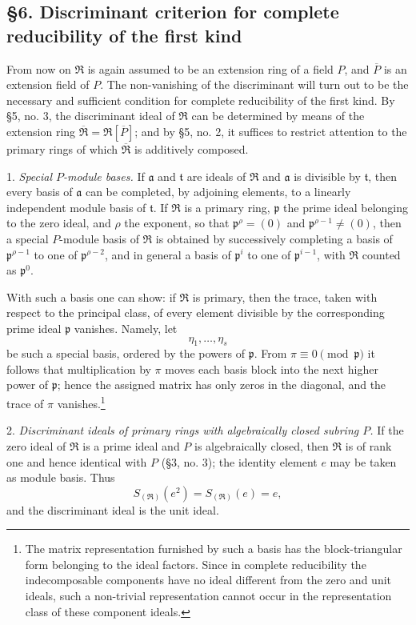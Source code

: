\documentclass[11pt]{article}
\providecommand{\mR}{\mathfrak{R}}
\providecommand{\bR}{\overline{\mathfrak{R}}}
\providecommand{\ma}{\mathfrak{a}}
\providecommand{\mpideal}{\mathfrak{p}}
\providecommand{\mt}{\mathfrak{t}}
\providecommand{\bP}{\overline{P}}
\begin{document}
\subsection*{§6. Discriminant criterion for complete reducibility of the first kind}

From now on $\mR$ is again assumed to be an extension ring of a field $P$, and $\bP$ is an extension field of $P$. The non-vanishing of the discriminant will turn out to be the necessary and sufficient condition for complete reducibility of the first kind. By §5, no. 3, the discriminant ideal of $\mR$ can be determined by means of the extension ring $\bR=\mR[\bP]$; and by §5, no. 2, it suffices to restrict attention to the primary rings of which $\bR$ is additively composed.

1. \emph{Special $P$-module bases.} If $\ma$ and $\mt$ are ideals of $\mR$ and $\ma$ is divisible by $\mt$, then every basis of $\ma$ can be completed, by adjoining elements, to a linearly independent module basis of $\mt$. If $\mR$ is a primary ring, $\mpideal$ the prime ideal belonging to the zero ideal, and $\rho$ the exponent, so that $\mpideal^\rho=(0)$ and $\mpideal^{\rho-1}\ne(0)$, then a special $P$-module basis of $\mR$ is obtained by successively completing a basis of $\mpideal^{\rho-1}$ to one of $\mpideal^{\rho-2}$, and in general a basis of $\mpideal^i$ to one of $\mpideal^{i-1}$, with $\mR$ counted as $\mpideal^0$.

With such a basis one can show: if $\mR$ is primary, then the trace, taken with respect to the principal class, of every element divisible by the corresponding prime ideal $\mpideal$ vanishes. Namely, let
\[
\eta_1,\ldots,\eta_s
\]
be such a special basis, ordered by the powers of $\mpideal$. From $\pi\equiv0\pmod{\mpideal}$ it follows that multiplication by $\pi$ moves each basis block into the next higher power of $\mpideal$; hence the assigned matrix has only zeros in the diagonal, and the trace of $\pi$ vanishes.\footnote{The matrix representation furnished by such a basis has the block-triangular form belonging to the ideal factors. Since in complete reducibility the indecomposable components have no ideal different from the zero and unit ideals, such a non-trivial representation cannot occur in the representation class of these component ideals.}

2. \emph{Discriminant ideals of primary rings with algebraically closed subring $P$.} If the zero ideal of $\mR$ is a prime ideal and $P$ is algebraically closed, then $\mR$ is of rank one and hence identical with $P$ (§3, no. 3); the identity element $e$ may be taken as module basis. Thus
\[
        S_{(\mR)}(e^2)=S_{(\mR)}(e)=e,
\]
and the discriminant ideal is the unit ideal.
\end{document}

